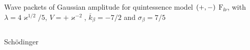 \documentclass[9pt]{beamer}
\begin{document}
\begin{frame}%
{Wave packets of Gaussian amplitude for quintessence model ${\left(+,-\right)}$}%
{$\mathrm{F}_{\ii\nu}$, with $\lambda = 4\varkappa^{1/2}/5$,
$V = +\varkappa^{-2}$, $\overline{k}_\beta = -7/2$ and $\sigma_\beta = 7/5$}
\begin{columns}
\begin{column}{.49\textwidth}
\begin{block}{Schödinger}

\end{block}
\end{column}
\end{columns}
\end{frame}
\end{document}
